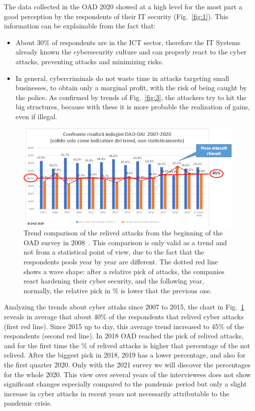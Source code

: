 \documentclass{easychair}
\begin{document}
The data collected in the OAD 2020 showed at a high level for the most part a good perception by the respondents of their IT security (Fig.~\ref{fig:1}).
This information can be explainable from the fact that:
 
\begin{itemize}
\item About 30\% of respondents are in the ICT sector, therefore the IT Systems already known the cybersecurity culture and can properly react to the cyber attacks, preventing 
attacks and minimizing risks.

\item In general, cybercriminals do not waste time in attacks targeting small businesses, to obtain only a marginal profit, 
with the risk of being caught by the police.  As confirmed by trends of Fig.~\ref{fig:3}, the attackers try to hit the big structures,
 because with these it is more probable the realization of gains, even if illegal.
\end{itemize}

\begin{figure}
	\centering
		\includegraphics[width=1\textwidth]{pictures/fig2.png}
		\caption{Trend comparison of the relived attacks from the beginning of the OAD survey in 2008~\cite{oad20}. This comparison is only valid as a trend and not from a statistical point 
of view, due to the fact that the respondents pools year by year are different. The dotted red line shows a wave shape: after a relative pick of attacks, the companies react hardening their cyber security, and the following year, normally, 
the relative pick in \% is lower that the previous one.}
		\label{fig:2}
\end{figure}

Analyzing the trends about cyber attaks since 2007 to 2015, the chart in Fig.~\ref{fig:2} reveals in average that about 40\% of the respondents that relived cyber attacks 
(first red line). Since 2015 up to day, this average trend increased to 45\% of the respondents (second red line). 
In 2018 OAD reached the pick of relived attacks, and  for the first time  the \% of relived attacks is higher that percentage of the not relived. After the biggest pick 
in 2018, 2019 has a lower percentage, and also for the first quarter 2020. Only with the 2021 survey we will discover the percentages for the whole 2020. 
This view over several years of the interviewees does not show significant changes especially compared to the pandemic period but only a slight increase in cyber attacks 
in recent years not necessarily attributable to the pandemic crisis.
\end{document}
